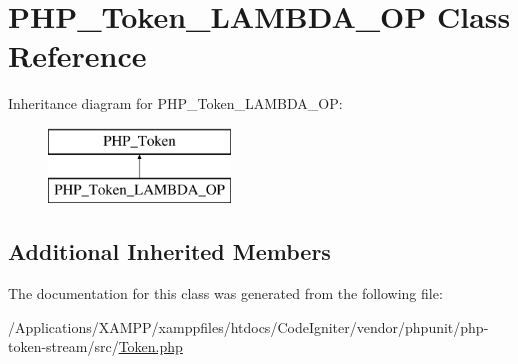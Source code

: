 \hypertarget{class_p_h_p___token___l_a_m_b_d_a___o_p}{}\section{P\+H\+P\+\_\+\+Token\+\_\+\+L\+A\+M\+B\+D\+A\+\_\+\+OP Class Reference}
\label{class_p_h_p___token___l_a_m_b_d_a___o_p}
Inheritance diagram for P\+H\+P\+\_\+\+Token\+\_\+\+L\+A\+M\+B\+D\+A\+\_\+\+OP\+:\begin{figure}[H]
\begin{center}
\leavevmode
\includegraphics[height=2.000000cm]{class_p_h_p___token___l_a_m_b_d_a___o_p}
\end{center}
\end{figure}
\subsection*{Additional Inherited Members}


The documentation for this class was generated from the following file\+:\begin{DoxyCompactItemize}
\item 
/\+Applications/\+X\+A\+M\+P\+P/xamppfiles/htdocs/\+Code\+Igniter/vendor/phpunit/php-\/token-\/stream/src/\mbox{\hyperlink{_token_8php}{Token.\+php}}\end{DoxyCompactItemize}
